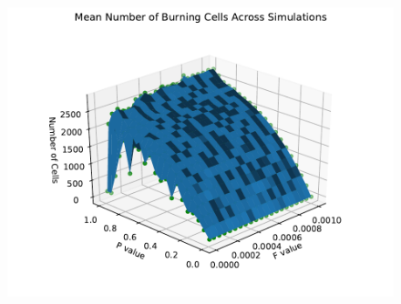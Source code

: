 \documentclass{article}
\begin{document}
\begin{figure}[H]
\centering
\includegraphics[scale=0.6]{Burning Mean 3D 2.pdf}
\label{fig:burnmean3D}
\end{figure}
\end{document}
